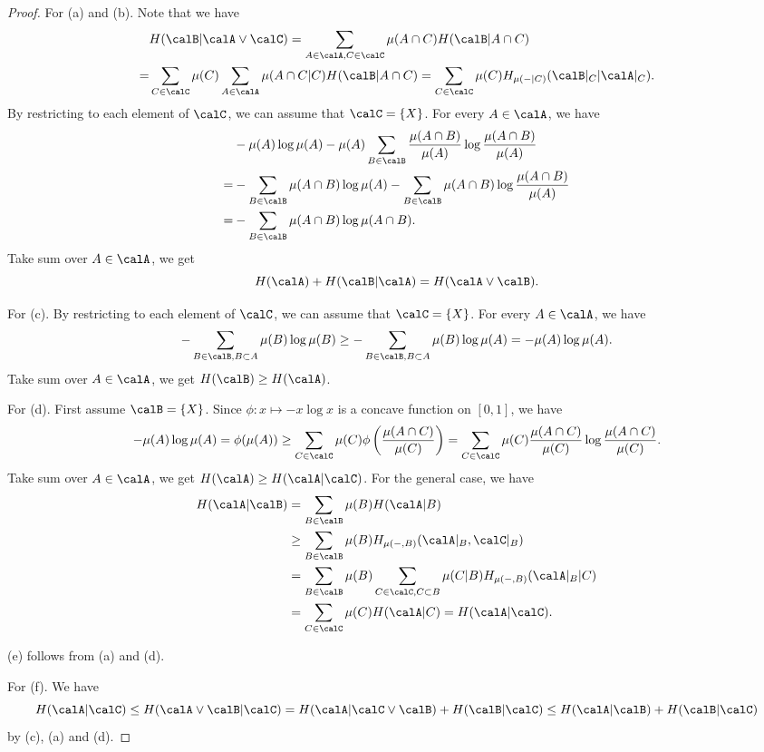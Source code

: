   \begin{proof}
    For (a) and (b). 
    Note that we have 
    \begin{align*}
      & H(\calB| \calA \vee \calC) = \sum_{A \in \calA, C \in \calC} \mu(A \cap C) H(\calB | A \cap C) \\
      =& \sum_{C \in \calC} \mu(C) \sum_{A \in \calA} \mu(A \cap C|C) H(\calB | A \cap C) = \sum_{C \in \calC} \mu(C) H_{\mu(-|C)}(\calB|_C|\calA|_C).
    \end{align*}
    By restricting to each element of $\calC$, we can assume that $\calC = \{X\}$.
    For every $A \in \calA$, we have
    \begin{align*}
      & - \mu(A) \log \mu(A) - \mu(A) \sum_{B \in \calB} \frac{\mu(A \cap B)}{\mu(A)} \log \frac{\mu(A \cap B)}{\mu(A)} \\
      = & - \sum_{B \in \calB} \mu(A \cap B) \log \mu(A) - \sum_{B \in \calB} \mu(A \cap B) \log \frac{\mu(A \cap B)}{\mu(A)} \\
      = & - \sum_{B \in \calB} \mu(A \cap B) \log \mu(A \cap B).
    \end{align*} 
    Take sum over $A \in \calA$, we get
    \[ H(\calA) + H(\calB | \calA) = H(\calA \vee \calB). \]
    
    For (c).
    By restricting to each element of $\calC$, we can assume that $\calC = \{X\}$.
    For every $A \in \calA$, we have 
    \[ - \sum_{B \in \calB, B \subset A} \mu(B) \log \mu(B) \geq -\sum_{B \in \calB, B \subset A} \mu(B) \log \mu(A) = -\mu(A) \log \mu(A). \]
    Take sum over $A \in \calA$, we get $H(\calB) \geq H(\calA)$.

    For (d).
    First assume $\calB = \{X\}$.
    Since $\phi: x \mapsto -x \log x$ is a concave function on $[0,1]$, we have
    \[ -\mu(A)\log \mu(A) = \phi(\mu(A)) \geq \sum_{C \in \calC} \mu(C) \phi\left(\frac{\mu(A \cap C)}{\mu(C)}\right) = \sum_{C \in \calC} \mu(C) \frac{\mu(A \cap C)}{\mu(C)} \log \frac{\mu(A \cap C)}{\mu(C)}. \]
    Take sum over $A \in \calA$, we get $H(\calA) \geq H(\calA | \calC)$.
    For the general case, we have
    \begin{align*}
      H(\calA | \calB) & = \sum_{B \in \calB} \mu(B) H(\calA | B) \\
      & \geq \sum_{B \in \calB} \mu(B) H_{\mu(-,B)}(\calA |_B, \calC|_B) \\
      & = \sum_{B \in \calB} \mu(B) \sum_{C \in \calC, C \subset B} \mu(C|B) H_{\mu(-,B)}(\calA|_B | C) \\
      & = \sum_{C \in \calC} \mu(C) H(\calA | C) = H(\calA | \calC).
    \end{align*}

    (e) follows from (a) and (d).

    For (f).
    We have 
    \[ H(\calA | \calC) \leq H(\calA \vee \calB | \calC) = H(\calA | \calC \vee \calB) + H(\calB | \calC) \leq H(\calA | \calB) + H(\calB | \calC) \]
    by (c), (a) and (d).
  \end{proof}



